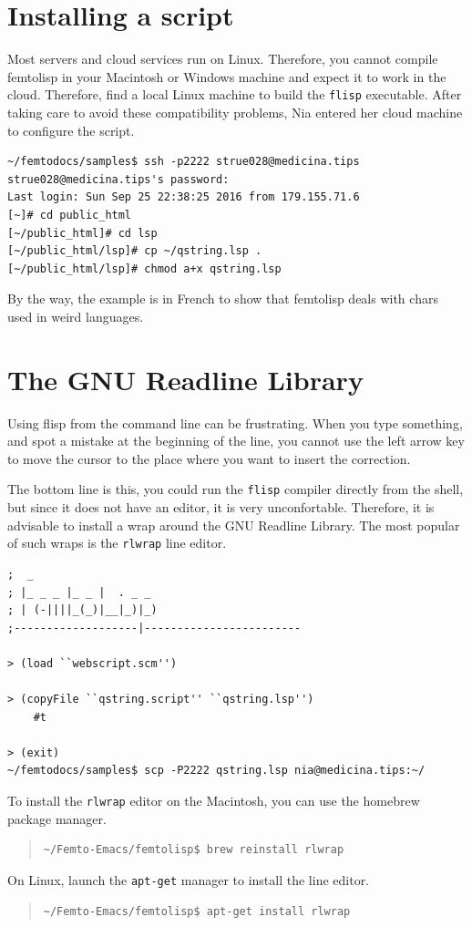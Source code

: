 \documentclass[a4paper,12pt]{book}
\begin{document}
\section{Installing a script}
Most servers and cloud services run on Linux.
Therefore, you cannot compile femtolisp in
your Macintosh or Windows machine and expect it
to work in the cloud. Therefore, find a local
Linux machine to build the \verb|flisp| executable.
After taking care to avoid these compatibility
problems, Nia entered her cloud machine to
configure the script.
\begin{Verbatim}[fontsize=\small,
    frame=single,
    framerule=0.5mm]
~/femtodocs/samples$ ssh -p2222 strue028@medicina.tips
strue028@medicina.tips's password:
Last login: Sun Sep 25 22:38:25 2016 from 179.155.71.6
[~]# cd public_html
[~/public_html]# cd lsp
[~/public_html/lsp]# cp ~/qstring.lsp .
[~/public_html/lsp]# chmod a+x qstring.lsp
\end{Verbatim}

By the way, the example is in French to show
that femtolisp deals with chars used in
weird languages.

\section{The GNU Readline Library}
Using flisp from the command line can be frustrating.
When you type something, and spot a mistake at the
beginning of the line, you cannot use the
\keys{$\leftarrow$} left arrow key to move
the cursor to the place where you want to
insert the correction. 


The bottom line is this, you could
run the \verb|flisp| compiler directly
from the shell, but since it does not
have an editor, it is very unconfortable.
Therefore, it is advisable to install
a wrap around the GNU Readline Library.
The most popular of such wraps
is the \verb|rlwrap| line editor.


\begin{Verbatim}[fontsize=\small,
    frame=single,
    framerule=0.5mm]
;  _
; |_ _ _ |_ _ |  . _ _
; | (-||||_(_)|__|_)|_)
;-------------------|------------------------

> (load ``webscript.scm'')

> (copyFile ``qstring.script'' ``qstring.lsp'')
    #t

> (exit)
~/femtodocs/samples$ scp -P2222 qstring.lsp nia@medicina.tips:~/
\end{Verbatim}


To install the \verb|rlwrap| editor
on the Macintosh, you can use the
homebrew package manager.
\begin{quote}
\begin{verbatim}
~/Femto-Emacs/femtolisp$ brew reinstall rlwrap
\end{verbatim}
\end{quote}
On Linux, launch the \verb|apt-get|
manager to install the line editor.
\begin{quote}
\begin{verbatim}
~/Femto-Emacs/femtolisp$ apt-get install rlwrap
\end{verbatim}
\end{quote}
\end{document}
